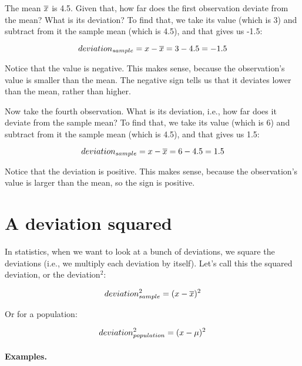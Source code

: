 \documentclass[../../../main.tex]{subfiles}
\begin{document}
\noindent
The mean $\overline{x}$ is 4.5. Given that, how far does the first observation deviate from the mean? What is its deviation? To find that, we take its value (which is 3) and subtract from it the sample mean (which is 4.5), and that gives us -1.5:

\begin{equation*}
  deviation_{sample} = x - \overline{x} = 3 - 4.5 = -1.5
\end{equation*}

\noindent
Notice that the value is negative. This makes sense, because the observation's value is smaller than the mean. The negative sign tells us that it deviates lower than the mean, rather than higher. 

Now take the fourth observation. What is its deviation, i.e., how far does it deviate from the sample mean? To find that, we take its value (which is 6) and subtract from it the sample mean (which is 4.5), and that gives us 1.5:

\begin{equation*}
  deviation_{sample} = x - \overline{x} = 6 - 4.5 = 1.5
\end{equation*}

\noindent
Notice that the deviation is positive. This makes sense, because the observation's value is larger than the mean, so the sign is positive. 


\section{A deviation squared}

In statistics, when we want to look at a bunch of deviations, we square the deviations (i.e., we multiply each deviation by itself). Let's call this the squared deviation, or the deviation$^{2}$:

\begin{equation*}
  deviation^{2}_{sample} = (x - \overline{x})^{2}
\end{equation*}

\noindent
Or for a population:

\begin{equation*}
  deviation^{2}_{population} = (x - \mu{})^{2}
\end{equation*}


\paragraph{Examples.}
\end{document}
